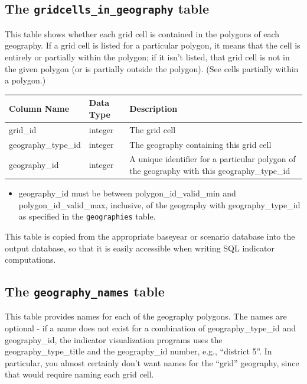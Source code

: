 \subsection{The {\tt gridcells_in_geography} table}

This table shows whether each grid cell is contained in the polygons of each
geography. If a grid cell is listed for a particular polygon, it means that the
cell is entirely or partially within the polygon; if it isn't listed, that grid
cell is not in the given polygon (or is partially outside the polygon). (See
cells partially within a polygon.)

\begin{tabular}{|l|l|p{4.5in}|}
\hline
\textbf{Column Name} & \textbf{Data Type} & \textbf{Description} \\
\hline
grid_id & integer & The grid cell  \\
\hline
geography_type_id & integer & The geography containing this grid cell  \\
\hline
geography_id & integer & A unique identifier for a particular polygon of the geography with this geography_type_id \\
\hline

\end{tabular}

\begin{itemize} \tight
\item geography_id must be between polygon_id_valid_min and
polygon_id_valid_max, inclusive, of the geography with geography_type_id as
specified in the \verb|geographies| table.
\end{itemize}

This table is copied from the appropriate baseyear or scenario database into
the output database, so that it is easily accessible when writing SQL indicator
computations.

\subsection{The {\tt geography_names} table}

This table provides names for each of the geography polygons. The names are
optional - if a name does not exist for a combination of geography_type_id and
geography_id, the indicator visualization programs uses the
geography_type_title and the geography_id number, e.g., ``district 5''. In
particular, you almost certainly don't want names for the ``grid'' geography,
since that would require naming each grid cell.

